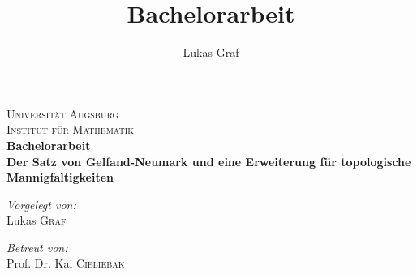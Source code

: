 \documentclass[a4paper,ngerman,bibtotoc]{scrartcl}
\title{Bachelorarbeit}
\author{Lukas Graf}
\theoremstyle{definition}
\theoremstyle{plain}
\theoremstyle{remark}
\begin{document}
\begin{titlepage}\center
\textsc{\LARGE Universität Augsburg}\\[1.5cm]

\textsc{\Large Institut für Mathematik}\\[2.5cm]

{ \huge \bfseries Bachelorarbeit \\[1.5cm]
\Large Der Satz von Gelfand-Neumark und eine Erweiterung für topologische Mannigfaltigkeiten \\[6cm] }



\vfill

\begin{minipage}{0.4\textwidth}
\begin{flushleft} \large
\emph{Vorgelegt von:}\\
 Lukas \textsc{Graf}
\end{flushleft}
\end{minipage}
\begin{minipage}{0.4\textwidth}
\begin{flushright} \large
\emph{Betreut von:} \\
 Prof. Dr. Kai \textsc{Cieliebak}
\end{flushright}
\end{minipage}

\end{titlepage}


\tableofcontents

\newpage


\newpage

\newpage

\newpage

\newpage


\newpage



\newpage
\nocite{*}
\printbibliography
\end{document}
